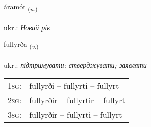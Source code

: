 \documentclass[frontgrid, backgrid]{flacards}\usepackage[]{graphicx}\usepackage[]{xcolor}
\begin{document}
\renewcommand{\flhead}{\vskip5pt \fboxsep=0pt {\small\bfseries\footnotesize Nafnorð | іменник}}
\renewcommand{\fcfoot}{\vskip5pt \fboxsep=0pt \hspace{2pt}{\small\bfseries\footnotesize 2K}}

\renewcommand{\blhead}{\vskip5pt {\small\bfseries\footnotesize Nafnorð | іменник }}
\renewcommand{\bcfoot}{\vskip5pt \hspace{2pt}{\small\bfseries\footnotesize 2K}}


{áramót \small{\textsubscript{(\textit{n.})}} \\[1ex] %
\textphonetic{[auːramout]} \\
ukr.: \emph{Новий рік} \\  [2ex]
\renewcommand*{\arraystretch}{0.8}
}

\renewcommand{\flhead}{\vskip5pt \fboxsep=0pt {\small\bfseries\footnotesize Sagnorð | дієслово}}
\renewcommand{\fcfoot}{\vskip5pt \fboxsep=0pt \hspace{2pt}{\small\bfseries\footnotesize 2K}}

\renewcommand{\blhead}{\vskip5pt {\small\bfseries\footnotesize Sagnorð | дієслово }}
\renewcommand{\bcfoot}{\vskip5pt \hspace{2pt}{\small\bfseries\footnotesize 2K}}


{fullyrða \small{\textsubscript{(\textit{v.})}} \\[1ex] %
\textphonetic{[fʏtlɪrða]} \\
ukr.: \emph{підтримувати; стверджувати; заявляти} \\  [2ex]
\renewcommand*{\arraystretch}{0.8}
\begin{tabular}{p{1cm}l}
\textsc{1sg}: & fullyrði -- fullyrti -- fullyrt \\ 
\textsc{2sg}: & fullyrðir -- fullyrtir -- fullyrt \\ 
\textsc{3sg}: & fullyrðir -- fullyrti -- fullyrt \\ 
\end{tabular}
}
\end{document}
